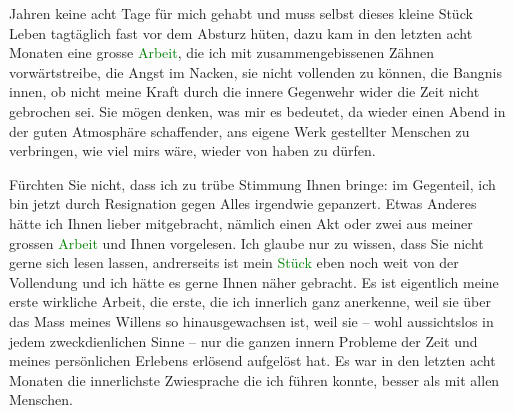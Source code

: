                Jahren keine acht Tage für mich gehabt und muss selbst dieses kleine Stück Leben
               tagtäglich fast vor dem Absturz hüten, dazu kam in den letzten acht Monaten eine
               grosse \textcolor{green}{Arbeit}\ledrightnote{{$\rightarrow$}\emph{\textcolor{green}{Jeremias. Ein dramatische Dichtung in neun Bildern}}}, die ich mit
               zusammengebissenen Zähnen vorwärts{\pb}treibe, die Angst im Nacken, sie nicht vollenden zu können, die Bangnis innen, ob
               nicht meine Kraft durch die innere Gegenwehr wider die Zeit nicht gebrochen sei. Sie
               mögen denken, was mir es bedeutet, da wieder einen Abend in der guten Atmosphäre
               schaffender, ans eigene Werk gestellter Menschen zu verbringen, wie viel mirs wäre,
               wieder von \label{K_L03659-2v}\label{K_L03659-2} haben zu dürfen.\pend
           
\pstart
           Fürchten Sie nicht, dass ich zu trübe Stimmung Ihnen bringe: im Gegenteil, ich bin
               jetzt durch Resignation gegen Alles irgendwie gepanzert. Etwas Anderes hätte ich
               Ihnen lieber mitgebracht, nämlich einen Akt oder zwei aus meiner grossen \textcolor{green}{Arbeit}\ledrightnote{{$\rightarrow$}\emph{\textcolor{green}{Jeremias. Ein dramatische Dichtung in neun Bildern}}} und Ihnen vorgelesen.
               Ich glaube nur zu wissen, dass Sie nicht gerne sich lesen lassen, andrerseits ist
               mein \textcolor{green}{Stück}\ledrightnote{{$\rightarrow$}\emph{\textcolor{green}{Jeremias. Ein dramatische Dichtung in neun Bildern}}} eben noch weit von
               der Vollendung und ich hätte es {\pb}gerne
               Ihnen näher gebracht. Es ist eigentlich meine erste wirkliche Arbeit, die erste, die
               ich innerlich ganz anerkenne, weil sie über das Mass meines Willens so
               hinausgewachsen ist, weil sie – wohl aussichtslos in jedem zweckdienlichen Sinne –
               nur die ganzen innern Probleme der Zeit und meines persönlichen Erlebens erlösend
               aufgelöst hat. Es war in den letzten acht Monaten die innerlichste Zwiesprache die
               ich führen konnte, besser als mit allen Menschen.\pend
           

